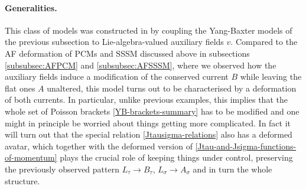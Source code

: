 \documentclass[12pt]{article}
\numberwithin{equation}{section}
\begin{document}
\paragraph{Generalities.} This class of models was constructed in \cite{Bielli:2024fnp} by coupling the Yang-Baxter models of the previous subsection to Lie-algebra-valued auxiliary fields $v$. Compared to the AF deformation of PCMs and SSSM discussed above in subsections \ref{subsubsec:AFPCM} and \ref{subsubsec:AFSSSM}, where we observed how the auxiliary fields induce a modification of the conserved current $B$ while leaving the flat ones $A$ unaltered, this model turns out to be characterised by a deformation of both currents. In particular, unlike previous examples, this implies that the whole set of Poisson brackets \eqref{YB-brackets-summary} has to be modified and one might in principle be worried about things getting more complicated. In fact it will turn out that the special relation \eqref{Jtausigma-relations} also has a deformed avatar, which together with the deformed version of \eqref{Jtau-and-Jsigma-functions-of-momentum} plays the crucial role of keeping things under control, preserving the previously observed pattern $L_{\tau}\rightarrow B_{\tau}$, $L_{\sigma}\rightarrow A_{\sigma}$ and in turn the whole structure.
\end{document}
